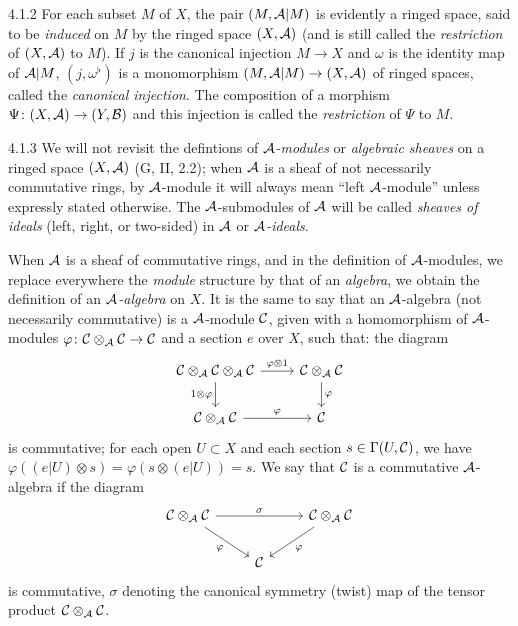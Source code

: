 \begin{env}{4.1.2}
\label{env-0.4.1.2}
For each subset $M$ of $X$, the pair $(M,\mathcal{A}|M)$ is evidently a ringed space, said
to be \emph{induced} on $M$ by the ringed space $(X,\mathcal{A})$ (and is still called
the \emph{restriction} of $(X,\mathcal{A})$ to $M$). If $j$ is the canonical injection
$M\to X$ and $\omega$ is the identity map of $\mathcal{A}|M$, $(j,\omega^\flat)$ is a
monomorphism $(M,\mathcal{A}|M)\to(X,\mathcal{A})$ of ringed spaces, called the
\emph{canonical injection}. The composition of a morphism
$\Psi\colon(X,\mathcal{A})\to(Y,\mathcal{B})$ and this injection is called the \emph{restriction}
of $\Psi$ to $M$.
\end{env}

\begin{env}{4.1.3}
\label{env-0.4.1.3}
We will not revisit the defintions of \emph{$\mathcal{A}$-modules} or
\emph{algebraic sheaves} on a ringed space $(X,\mathcal{A})$ (G, II, 2.2);
when $\mathcal{A}$ is a sheaf of not necessarily commutative rings, by $\mathcal{A}$-module
it will always mean ``left $\mathcal{A}$-module'' unless expressly stated otherwise. The
$\mathcal{A}$-submodules of $\mathcal{A}$ will be called \emph{sheaves of ideals} (left,
right, or two-sided) in $\mathcal{A}$ or \emph{$\mathcal{A}$-ideals}.

When $\mathcal{A}$ is a sheaf of commutative rings, and in the definition of
$\mathcal{A}$-modules, we replace everywhere the \emph{module} structure by that of
an \emph{algebra}, we obtain the definition of an \emph{$\mathcal{A}$-algebra} on $X$.
It is the same to say that an $\mathcal{A}$-algebra (not necessarily commutative) is
a $\mathcal{A}$-module $\mathcal{C}$, given with a homomorphism of $\mathcal{A}$-modules
$\varphi\colon\mathcal{C}\otimes_{\mathcal{A}}\mathcal{C}\to\mathcal{C}$ and a section $e$ over $X$,
such that:  the diagram
\[
  \begin{tikzcd}
    \sheaf{C}\otimes_{\sheaf{A}}\sheaf{C}\otimes_{\sheaf{A}}\sheaf{C}
    \ar[r,"\varphi\otimes 1"]\ar[d,"1\otimes\varphi"'] &
    \sheaf{C}\otimes_{\sheaf{A}}\sheaf{C}\ar[d,"\varphi"]\\
    \sheaf{C}\otimes_{\sheaf{A}}\sheaf{C}\ar[r,"\varphi"] & \sheaf{C}
  \end{tikzcd}
\]
is commutative;  for each open $U\subset X$ and each section $s\in\Gamma(U,\mathcal{C})$,
we have $\varphi((e|U)\otimes s)=\varphi(s\otimes(e|U))=s$. We say that $\mathcal{C}$ is a
commutative $\mathcal{A}$-algebra if the diagram
\[
  \begin{tikzcd}
    \sheaf{C}\otimes_{\sheaf{A}}\sheaf{C}\ar[rr,"\sigma"]\ar[rd,"\varphi"']
    & & \sheaf{C}\otimes_{\sheaf{A}}\sheaf{C}\ar[ld,"\varphi"]\\
   & \sheaf{C}
  \end{tikzcd}
\]
is commutative, $\sigma$ denoting the canonical symmetry (twist) map of the tensor product
$\mathcal{C}\otimes_{\mathcal{A}}\mathcal{C}$.


\end{env}

